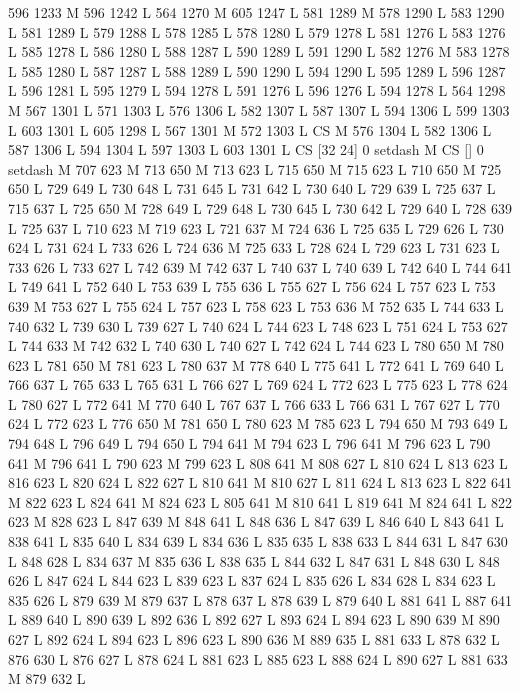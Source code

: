 {{{{{{{{{{{{{{{{{{{{{{{{{{{{{{596 1233 M 596 1242 L
564 1270 M 605 1247 L
581 1289 M 578 1290 L
583 1290 L
581 1289 L
579 1288 L
578 1285 L
578 1280 L
579 1278 L
581 1276 L
583 1276 L
585 1278 L
586 1280 L
588 1287 L
590 1289 L
591 1290 L
582 1276 M 583 1278 L
585 1280 L
587 1287 L
588 1289 L
590 1290 L
594 1290 L
595 1289 L
596 1287 L
596 1281 L
595 1279 L
594 1278 L
591 1276 L
596 1276 L
594 1278 L
564 1298 M 567 1301 L
571 1303 L
576 1306 L
582 1307 L
587 1307 L
594 1306 L
599 1303 L
603 1301 L
605 1298 L
567 1301 M 572 1303 L
CS M
576 1304 L
582 1306 L
587 1306 L
594 1304 L
597 1303 L
603 1301 L
CS [32 24] 0 setdash M
CS [] 0 setdash M
707 623 M 713 650 M 713 623 L
715 650 M 715 623 L
710 650 M 725 650 L
729 649 L
730 648 L
731 645 L
731 642 L
730 640 L
729 639 L
725 637 L
715 637 L
725 650 M 728 649 L
729 648 L
730 645 L
730 642 L
729 640 L
728 639 L
725 637 L
710 623 M 719 623 L
721 637 M 724 636 L
725 635 L
729 626 L
730 624 L
731 624 L
733 626 L
724 636 M 725 633 L
728 624 L
729 623 L
731 623 L
733 626 L
733 627 L
742 639 M 742 637 L
740 637 L
740 639 L
742 640 L
744 641 L
749 641 L
752 640 L
753 639 L
755 636 L
755 627 L
756 624 L
757 623 L
753 639 M 753 627 L
755 624 L
757 623 L
758 623 L
753 636 M 752 635 L
744 633 L
740 632 L
739 630 L
739 627 L
740 624 L
744 623 L
748 623 L
751 624 L
753 627 L
744 633 M 742 632 L
740 630 L
740 627 L
742 624 L
744 623 L
780 650 M 780 623 L
781 650 M 781 623 L
780 637 M 778 640 L
775 641 L
772 641 L
769 640 L
766 637 L
765 633 L
765 631 L
766 627 L
769 624 L
772 623 L
775 623 L
778 624 L
780 627 L
772 641 M 770 640 L
767 637 L
766 633 L
766 631 L
767 627 L
770 624 L
772 623 L
776 650 M 781 650 L
780 623 M 785 623 L
794 650 M 793 649 L
794 648 L
796 649 L
794 650 L
794 641 M 794 623 L
796 641 M 796 623 L
790 641 M 796 641 L
790 623 M 799 623 L
808 641 M 808 627 L
810 624 L
813 623 L
816 623 L
820 624 L
822 627 L
810 641 M 810 627 L
811 624 L
813 623 L
822 641 M 822 623 L
824 641 M 824 623 L
805 641 M 810 641 L
819 641 M 824 641 L
822 623 M 828 623 L
847 639 M 848 641 L
848 636 L
847 639 L
846 640 L
843 641 L
838 641 L
835 640 L
834 639 L
834 636 L
835 635 L
838 633 L
844 631 L
847 630 L
848 628 L
834 637 M 835 636 L
838 635 L
844 632 L
847 631 L
848 630 L
848 626 L
847 624 L
844 623 L
839 623 L
837 624 L
835 626 L
834 628 L
834 623 L
835 626 L
879 639 M 879 637 L
878 637 L
878 639 L
879 640 L
881 641 L
887 641 L
889 640 L
890 639 L
892 636 L
892 627 L
893 624 L
894 623 L
890 639 M 890 627 L
892 624 L
894 623 L
896 623 L
890 636 M 889 635 L
881 633 L
878 632 L
876 630 L
876 627 L
878 624 L
881 623 L
885 623 L
888 624 L
890 627 L
881 633 M 879 632 L
}}}}}}}}}}}}}}}}}}}}}}}}}}}}}}
